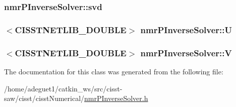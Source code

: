 \hypertarget{classnmr_p_inverse_solver_ab8b996e0cc032076ff7035a4d471ff03}{
\subsubsection[{svd}]{ nmr\-P\-Inverse\-Solver\-::svd\hspace{0.3cm}{\ttfamily [protected]}}}\label{classnmr_p_inverse_solver_ab8b996e0cc032076ff7035a4d471ff03}
\hypertarget{classnmr_p_inverse_solver_a25f08dc0a3380bb613f5e79b8cd9678a}{
\subsubsection[{U}]{$<$C\-I\-S\-S\-T\-N\-E\-T\-L\-I\-B\-\_\-\-D\-O\-U\-B\-L\-E$>$ nmr\-P\-Inverse\-Solver\-::\-U\hspace{0.3cm}{\ttfamily [protected]}}}\label{classnmr_p_inverse_solver_a25f08dc0a3380bb613f5e79b8cd9678a}
\hypertarget{classnmr_p_inverse_solver_af28274cc42c66aa6fd7b48b04b35d249}{
\subsubsection[{V}]{$<$C\-I\-S\-S\-T\-N\-E\-T\-L\-I\-B\-\_\-\-D\-O\-U\-B\-L\-E$>$ nmr\-P\-Inverse\-Solver\-::\-V\hspace{0.3cm}{\ttfamily [protected]}}}\label{classnmr_p_inverse_solver_af28274cc42c66aa6fd7b48b04b35d249}


The documentation for this class was generated from the following file\-:\begin{DoxyCompactItemize}
\item 
/home/adeguet1/catkin\-\_\-ws/src/cisst-\/saw/cisst/cisst\-Numerical/\hyperlink{nmr_p_inverse_solver_8h}{nmr\-P\-Inverse\-Solver.\-h}\end{DoxyCompactItemize}
